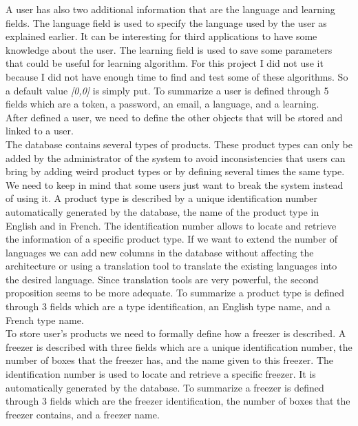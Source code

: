 A user has also two additional information that are the language and learning fields. The language field is used to specify the language used by the user as explained earlier. It can be interesting for third applications to have some knowledge about the user. The learning field is used to save some parameters that could be useful for learning algorithm. For this project I did not use it because I did not have enough time to find and test some of these algorithms. So a default value \textit{[0,0]} is simply put. To summarize a user is defined through 5 fields which are a token, a password, an email, a language, and a learning.\\

After defined a user, we need to define the other objects that will be stored and linked to a user.\\

The database contains several types of products. These product types can only be added by the administrator of the system to avoid inconsistencies that users can bring by adding weird product types or by defining several times the same type. We need to keep in mind that some users just want to break the system instead of using it. A product type is described by a unique identification number automatically generated by the database, the name of the product type in English and in French. The identification number allows to locate and retrieve the information of a specific product type. If we want to extend the number of languages we can add new columns in the database without affecting the architecture or using a translation tool to translate the existing languages into the desired language. Since translation tools are very powerful, the second proposition seems to be more adequate. To summarize a product type is defined through 3 fields which are a type identification, an English type name, and a French type name.\\

To store user's products we need to formally define how a freezer is described. A freezer is described with three fields which are a unique identification number, the number of boxes that the freezer has, and the name given to this freezer. The identification number is used to locate and retrieve a specific freezer. It is automatically generated by the database. To summarize a freezer is defined through 3 fields which are the freezer identification, the number of boxes that the freezer contains, and a freezer name.\\

